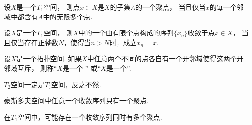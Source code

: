 \begin{theorem}
设\(X\)是一个\(T_1\)空间，
则点\(x \in X\)是\(X\)的子集\(A\)的一个聚点，
当且仅当\(x\)的每一个邻域中都含有\(A\)中的无限多个点.
\end{theorem}

\begin{theorem}
设\(X\)是一个\(T_1\)空间，
则\(X\)中的一个由有限个点构成的序列\(\{x_n\}\)收敛于点\(x \in X\)，
当且仅当存在正整数\(N\)，使得当\(n>N\)时，成立\(x_n=x\).
\end{theorem}

\begin{definition}
设\(X\)是一个拓扑空间.
如果\(X\)中任意两个不同的点各自有一个开邻域使得这两个开邻域互斥，
则称“\(X\)是一个 ”
或“\(X\)是一个”.
\end{definition}

\begin{proposition}
\(T_2\)空间一定是\(T_1\)空间，反之不然.
\end{proposition}

\begin{theorem}
豪斯多夫空间中任意一个收敛序列只有一个聚点.
\end{theorem}

在\(T_1\)空间中，可能存在一个收敛序列同时有多个聚点.
